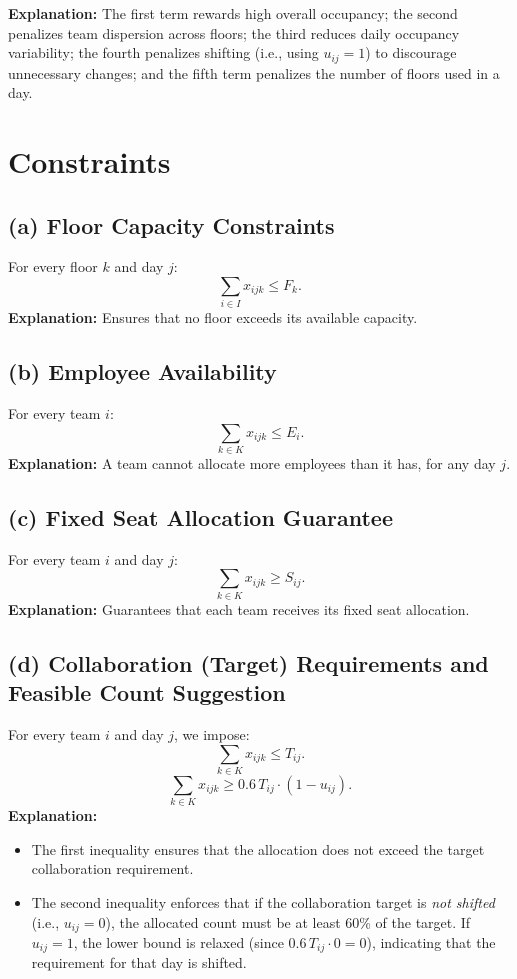 \documentclass[11pt]{article}
\begin{document}
\textbf{Explanation:} The first term rewards high overall occupancy; the second penalizes team dispersion across floors; the third reduces daily occupancy variability; the fourth penalizes shifting (i.e., using \( u_{ij}=1 \)) to discourage unnecessary changes; and the fifth term penalizes the number of floors used in a day.

\section{Constraints}
\subsection*{(a) Floor Capacity Constraints}
For every floor $k$ and day $j$:
\[
\sum_{i \in I} x_{ijk} \leq F_k.
\]
\textbf{Explanation:} Ensures that no floor exceeds its available capacity.

\subsection*{(b) Employee Availability}
For every team $i$:
\[
 \sum_{k \in K} x_{ijk} \leq E_i.
\]
\textbf{Explanation:} A team cannot allocate more employees than it has, for any day \(j\).

\subsection*{(c) Fixed Seat Allocation Guarantee}
For every team $i$ and day $j$:
\[
\sum_{k \in K} x_{ijk} \geq S_{ij}.
\]
\textbf{Explanation:} Guarantees that each team receives its fixed seat allocation.

\subsection*{(d) Collaboration (Target) Requirements and Feasible Count Suggestion}
For every team $i$ and day $j$, we impose:
\[
\sum_{k \in K} x_{ijk} \leq T_{ij}.
\]
\[
\sum_{k \in K} x_{ijk} \geq 0.6\, T_{ij} \cdot (1 - u_{ij}).
\]
\textbf{Explanation:}  
\begin{itemize}[leftmargin=2em]
    \item The first inequality ensures that the allocation does not exceed the target collaboration requirement.
    \item The second inequality enforces that if the collaboration target is \emph{not shifted} (i.e., \(u_{ij}=0\)), the allocated count must be at least 60\% of the target. If \(u_{ij}=1\), the lower bound is relaxed (since $0.6\, T_{ij}\cdot0=0$), indicating that the requirement for that day is shifted.
\end{itemize}
\end{document}
